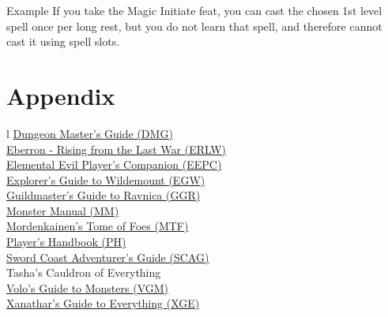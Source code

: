 \documentclass[letterpaper,twocolumn,openany,nodeprecatedcode]{dndbook}
\begin{document}
\begin{DndComment}{Example}
If you take the Magic Initiate feat, you can cast the chosen 1st level spell once per long rest, but you do not learn that spell, and therefore cannot cast it using spell slots.
\end{DndComment}











\chapter{Appendix}

\label{sources}
\begin{DndTable}[header=Official Sourcebooks]{l}
    \href{https://thetrove.is/Books/Dungeons\%20\&\%20Dragons/5th\%20Edition\%20(5e)/Core/Dungeon\%20Master\%27s\%20Guide.pdf}{Dungeon Master's Guide (DMG)} \\
    \href{https://thetrove.is/Books/Dungeons\%20\&\%20Dragons/5th\%20Edition\%20(5e)/Core/Eberron\%20-Rising\%20from\%20the\%20Last\%20War.pdf}{Eberron - Rising from the Last War (ERLW)} \\
    \href{https://media.wizards.com/2015/downloads/dnd/EE_PlayersCompanion.pdf}{Elemental Evil Player's Companion (EEPC)} \\
    \href{https://thetrove.is/Books/Dungeons\%20\&\%20Dragons/5th\%20Edition\%20(5e)/Core/Explorer\%27s\%20Guide\%20to\%20Wildemount.pdf}{Explorer's Guide to Wildemount (EGW)} \\
    \href{https://thetrove.is/Books/Dungeons\%20\&\%20Dragons/5th\%20Edition\%20(5e)/Core/Guildmasters\%27\%20Guide\%20to\%20Ravnica.pdf}{Guildmaster's Guide to Ravnica (GGR)} \\
    \href{https://thetrove.is/Books/Dungeons\%20\&\%20Dragons/5th\%20Edition\%20(5e)/Core/Monster\%20Manual\%20\%5B11th\%20Print\%5D.pdf}{Monster Manual (MM)} \\
    \href{https://thetrove.is/Books/Dungeons\%20\&\%20Dragons/5th\%20Edition\%20(5e)/Core/Mordenkainen\%27s\%20Tome\%20of\%20Foes.pdf}{Mordenkainen's Tome of Foes (MTF)} \\
    \href{https://thetrove.is/Books/Dungeons\%20\&\%20Dragons/5th\%20Edition\%20(5e)/Core/Player\%27s\%20Handbook\%20\%5B10th\%20Print\%5D.pdf}{Player's Handbook (PH)} \\
    \href{https://thetrove.is/Books/Dungeons\%20\&\%20Dragons/5th\%20Edition\%20(5e)/Core/Sword\%20Coast\%20Adventurer\%27s\%20Guide.pdf}{Sword Coast Adventurer's Guide (SCAG)} \\
    Tasha's Cauldron of Everything \\
    \href{https://thetrove.is/Books/Dungeons\%20\&\%20Dragons/5th\%20Edition\%20(5e)/Core/Volo\%27s\%20Guide\%20to\%20Monsters.pdf}{Volo's Guide to Monsters (VGM)} \\
    \href{https://thetrove.is/Books/Dungeons\%20\&\%20Dragons/5th\%20Edition\%20(5e)/Core/Xanathar\%27s\%20Guide\%20to\%20Everything.pdf}{Xanathar's Guide to Everything (XGE)} \\
\end{DndTable}
\end{document}
